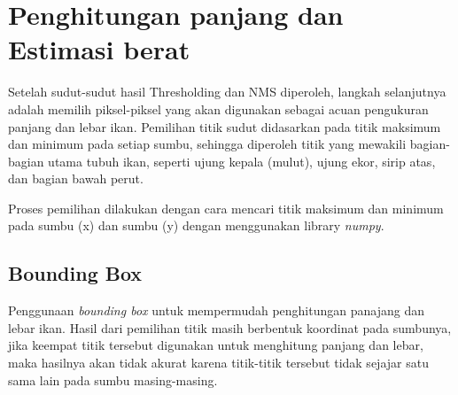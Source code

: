 \section{Penghitungan panjang dan Estimasi berat}
    Setelah sudut-sudut hasil Thresholding dan NMS diperoleh, langkah selanjutnya adalah memilih piksel-piksel yang akan digunakan sebagai acuan pengukuran panjang dan lebar ikan. 
Pemilihan titik sudut didasarkan pada titik maksimum dan minimum pada setiap sumbu, sehingga diperoleh titik yang mewakili bagian-bagian utama tubuh ikan, seperti ujung kepala (mulut), ujung ekor, sirip atas, dan bagian bawah perut.

    Proses pemilihan dilakukan dengan cara mencari titik maksimum dan minimum pada sumbu (x) dan sumbu (y) dengan menggunakan library \emph{numpy}.



\subsection{Bounding Box}
    Penggunaan \emph{bounding box} untuk mempermudah penghitungan panajang dan lebar ikan. Hasil dari pemilihan titik masih berbentuk koordinat pada sumbunya, 
jika keempat titik tersebut digunakan untuk menghitung panjang dan lebar, maka hasilnya akan tidak akurat karena titik-titik tersebut tidak sejajar satu sama lain pada sumbu masing-masing.

